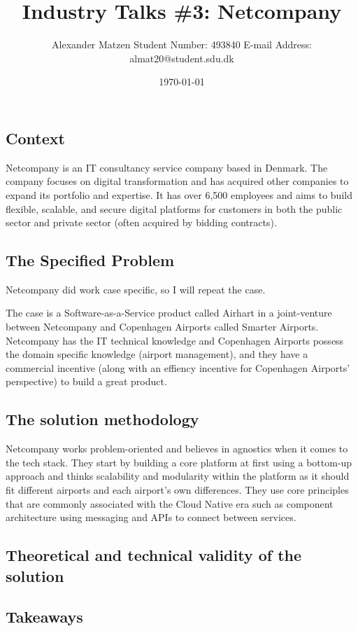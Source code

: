 \documentclass[11pt]{article}
\begin{document}
\setlength\parindent{0pt}
\setlength{\parskip}{.15em}
\pagestyle{empty}

\title{Industry Talks \#3: Netcompany}
\author{Alexander Matzen \addvspace{1em} Student Number: 493840 \newline E-mail Address: almat20@student.sdu.dk}
\date{\today}


\pagecolor{white}



\subsection*{Context}
Netcompany is an IT consultancy service company based in Denmark. The company focuses on digital transformation and has acquired other companies to expand its portfolio and expertise. It has over 6,500 employees and aims to build flexible, scalable, and secure digital platforms for customers in both the public sector and private sector (often acquired by bidding contracts).

\subsection*{The Specified Problem}
Netcompany did work case specific, so I will repeat the case.

The case is a Software-as-a-Service product called Airhart in a joint-venture between Netcompany and Copenhagen Airports called Smarter Airports. Netcompany has the IT technical knowledge and Copenhagen Airports possess the domain specific knowledge (airport management), and they have a commercial incentive (along with an effiency incentive for Copenhagen Airports' perspective) to build a great product.


\subsection*{The solution methodology}
Netcompany works problem-oriented and believes in agnostics when it comes to the tech stack. They start by building a core platform at first using a bottom-up approach and thinks scalability and modularity within the platform as it should fit different airports and each airport's own differences. They use core principles that are commonly associated with the Cloud Native era such as component architecture using messaging and APIs to connect between services.



\subsection*{Theoretical and technical validity of the solution}


\subsection*{Takeaways}
\end{document}
